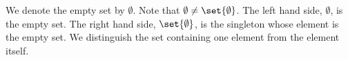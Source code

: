 We denote the empty set
by $\emptyset$.
Note that
$\emptyset \neq \set{\emptyset}$.
The left hand side, $\emptyset$,
is the empty set.
The right hand side, $\set{\emptyset}$, is
the singleton whose element
is the empty set.
We distinguish the set
containing one element from the
element itself.




\strats
